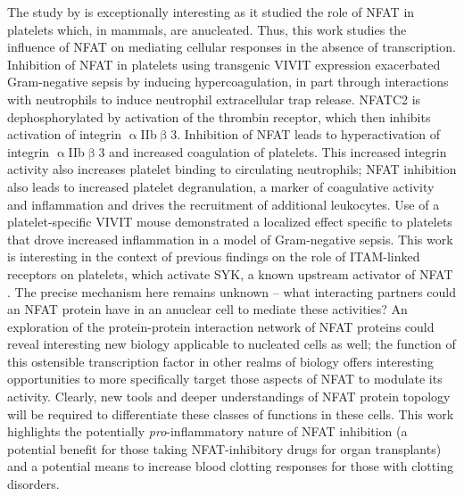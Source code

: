 The study by \citet{Poli2022} is exceptionally interesting as it studied the role of NFAT in platelets which, in mammals, are anucleated. Thus, this work studies the influence of NFAT on mediating cellular responses in the absence of transcription. Inhibition of NFAT in platelets using transgenic VIVIT expression exacerbated Gram\hyp{}negative sepsis by inducing hypercoagulation, in part through interactions with neutrophils to induce neutrophil extracellular trap release. NFATC2 is dephosphorylated by activation of the thrombin receptor, which then inhibits activation of integrin $\upalpha$IIb$\upbeta$3. Inhibition of NFAT leads to hyperactivation of integrin $\upalpha$IIb$\upbeta$3 and increased coagulation of platelets. This increased integrin activity also increases platelet binding to circulating neutrophils; NFAT inhibition also leads to increased platelet degranulation, a marker of coagulative activity and inflammation and drives the recruitment of additional leukocytes. Use of a platelet\hyp{}specific VIVIT mouse demonstrated a localized effect specific to platelets that drove increased inflammation in a model of Gram\hyp{}negative sepsis. This work is interesting in the context of previous findings on the role of ITAM\hyp{}linked receptors on platelets, which activate SYK, a known upstream activator of NFAT \citep{Manne2015}. The precise mechanism here remains unknown -- what interacting partners could an NFAT protein have in an anuclear cell to mediate these activities? An exploration of the protein\hyp{}protein interaction network of NFAT proteins could reveal interesting new biology applicable to nucleated cells as well; the function of this ostensible transcription factor in other realms of biology offers interesting opportunities to more specifically target those aspects of NFAT to modulate its activity. Clearly, new tools and deeper understandings of NFAT protein topology will be required to differentiate these classes of functions in these cells. This work highlights the potentially \textit{pro}\hyp{}inflammatory nature of NFAT inhibition (a potential benefit for those taking NFAT\hyp{}inhibitory drugs for organ transplants) and a potential means to increase blood clotting responses for those with clotting disorders.

